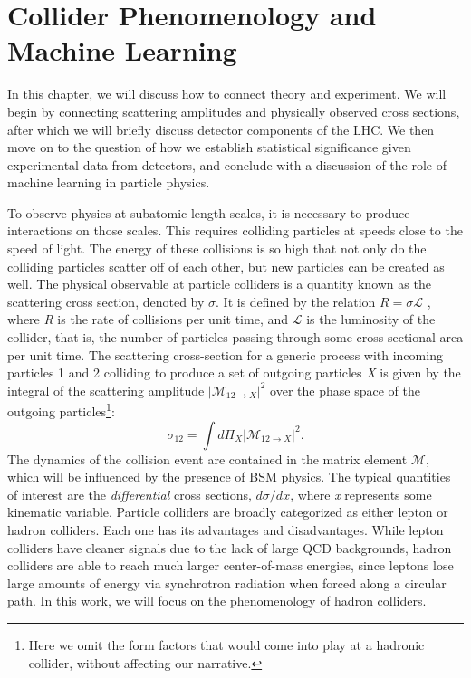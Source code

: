 \chapter{Collider Phenomenology and Machine Learning}\label{ch:ColliderPheno}
In this chapter, we will discuss how to connect theory and experiment. We will begin by connecting scattering amplitudes and physically observed cross sections, after which we will briefly discuss detector components of the LHC. We then move on to the question of how we establish statistical significance given experimental data from detectors, and conclude with a discussion of the role of machine learning in particle physics.

To observe physics at subatomic length scales, it is necessary to produce interactions on those scales. This requires colliding particles at speeds close to the speed of light. The energy of these collisions is so high that not only do the colliding particles scatter off of each other, but new particles can be created as well. 
The physical observable at particle colliders is a quantity known as the scattering cross section, denoted by $\sigma$. It is defined by the relation
$R = \sigma\mathcal{L}$
, where \emph{R} is the rate of collisions per unit time, and $\mathcal{L}$ is the luminosity of the collider, that is, the number of particles passing through some cross-sectional area per unit time. The scattering cross-section for a generic process with incoming particles 1 and 2 colliding to produce a set of outgoing particles \emph{X} is given by the integral of the scattering amplitude $|\mathcal{M}_{12\rightarrow X}|^2$ over the phase space of the outgoing particles\footnote{Here we omit the form factors that would come into play at a hadronic collider, without affecting our narrative.}:
\begin{equation}
  \sigma_{12} = \int d\Pi_X |\mathcal{M}_{12\rightarrow X}|^2.
\end{equation}
The dynamics of the collision event are contained in the matrix element $\mathcal{M}$, which will be influenced by the presence of BSM physics.
The typical quantities of interest are the \emph{differential} cross sections, $d\sigma/dx$, where \emph{x} represents some kinematic variable. 
Particle colliders are broadly categorized as either lepton or hadron colliders. Each one has its advantages and disadvantages. While lepton colliders have cleaner signals due to the lack of large QCD backgrounds, hadron colliders are able to reach much larger center-of-mass energies, since leptons lose large amounts of energy via synchrotron radiation when forced along a circular path. In this work, we will focus on the phenomenology of hadron colliders.

